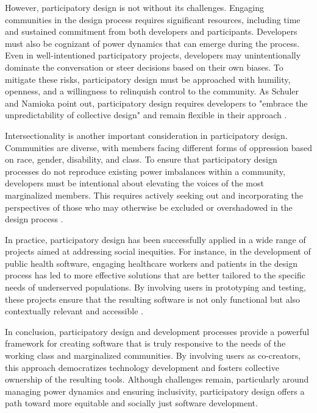 \begin{refsection}
However, participatory design is not without its challenges. Engaging communities in the design process requires significant resources, including time and sustained commitment from both developers and participants. Developers must also be cognizant of power dynamics that can emerge during the process. Even in well-intentioned participatory projects, developers may unintentionally dominate the conversation or steer decisions based on their own biases. To mitigate these risks, participatory design must be approached with humility, openness, and a willingness to relinquish control to the community. As Schuler and Namioka point out, participatory design requires developers to "embrace the unpredictability of collective design" and remain flexible in their approach \cite[pp.~5-7]{schuler1993}.

Intersectionality is another important consideration in participatory design. Communities are diverse, with members facing different forms of oppression based on race, gender, disability, and class. To ensure that participatory design processes do not reproduce existing power imbalances within a community, developers must be intentional about elevating the voices of the most marginalized members. This requires actively seeking out and incorporating the perspectives of those who may otherwise be excluded or overshadowed in the design process \cite[pp.~256-258]{kensing2003}.

In practice, participatory design has been successfully applied in a wide range of projects aimed at addressing social inequities. For instance, in the development of public health software, engaging healthcare workers and patients in the design process has led to more effective solutions that are better tailored to the specific needs of underserved populations. By involving users in prototyping and testing, these projects ensure that the resulting software is not only functional but also contextually relevant and accessible \cite[pp.~101-103]{kensing2003}.

In conclusion, participatory design and development processes provide a powerful framework for creating software that is truly responsive to the needs of the working class and marginalized communities. By involving users as co-creators, this approach democratizes technology development and fosters collective ownership of the resulting tools. Although challenges remain, particularly around managing power dynamics and ensuring inclusivity, participatory design offers a path toward more equitable and socially just software development.


\end{refsection}
